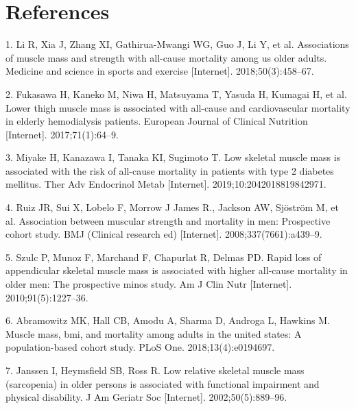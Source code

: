 \documentclass[twoside,10pt]{gihclass} %
\begin{document}
\backmatter

\hypertarget{references}{%
\chapter*{References}\label{references}}


\noindent

\setlength{\parindent}{-0.20in}
\setlength{\leftskip}{0.20in}
\setlength{\parskip}{8pt}

\hypertarget{refs}{}
\leavevmode\hypertarget{ref-RN2512}{}%
1. Li R, Xia J, Zhang XI, Gathirua-Mwangi WG, Guo J, Li Y, et al. Associations of muscle mass and strength with all-cause mortality among us older adults. Medicine and science in sports and exercise {[}Internet{]}. 2018;50(3):458--67.

\leavevmode\hypertarget{ref-RN2513}{}%
2. Fukasawa H, Kaneko M, Niwa H, Matsuyama T, Yasuda H, Kumagai H, et al. Lower thigh muscle mass is associated with all-cause and cardiovascular mortality in elderly hemodialysis patients. European Journal of Clinical Nutrition {[}Internet{]}. 2017;71(1):64--9.

\leavevmode\hypertarget{ref-RN2514}{}%
3. Miyake H, Kanazawa I, Tanaka KI, Sugimoto T. Low skeletal muscle mass is associated with the risk of all-cause mortality in patients with type 2 diabetes mellitus. Ther Adv Endocrinol Metab {[}Internet{]}. 2019;10:2042018819842971.

\leavevmode\hypertarget{ref-RN2376}{}%
4. Ruiz JR, Sui X, Lobelo F, Morrow J James R., Jackson AW, Sjöström M, et al. Association between muscular strength and mortality in men: Prospective cohort study. BMJ (Clinical research ed) {[}Internet{]}. 2008;337(7661):a439--9.

\leavevmode\hypertarget{ref-RN2515}{}%
5. Szulc P, Munoz F, Marchand F, Chapurlat R, Delmas PD. Rapid loss of appendicular skeletal muscle mass is associated with higher all-cause mortality in older men: The prospective minos study. Am J Clin Nutr {[}Internet{]}. 2010;91(5):1227--36.

\leavevmode\hypertarget{ref-RN2516}{}%
6. Abramowitz MK, Hall CB, Amodu A, Sharma D, Androga L, Hawkins M. Muscle mass, bmi, and mortality among adults in the united states: A population-based cohort study. PLoS One. 2018;13(4):e0194697.

\leavevmode\hypertarget{ref-RN2517}{}%
7. Janssen I, Heymsfield SB, Ross R. Low relative skeletal muscle mass (sarcopenia) in older persons is associated with functional impairment and physical disability. J Am Geriatr Soc {[}Internet{]}. 2002;50(5):889--96.
\end{document}
